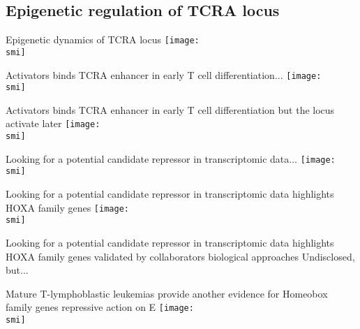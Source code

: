 \documentclass[10pt]{beamer}
\def\smi{out/ln/updir/mw-gcthesis-oral/library.bib}
\begin{document}
\subsection{Epigenetic regulation of TCRA locus}
\begin{frame}{Epigenetic dynamics of TCRA locus}
  \def\smi{out/ln/updir/mw-gcthesis-oral/ink/chromatin-states/genome-view/tcra.pdf}
  \texttt{[image: \\smi]}
\end{frame}
\begin{frame}{Activators binds TCRA enhancer in early T cell differentiation...}
  \def\smi{out/ln/updir/mw-gcthesis-oral/ink/ea-tf-mouse.pdf}
  \texttt{[image: \\smi]}%
\end{frame}
\begin{frame}{Activators binds TCRA enhancer in early T cell differentiation but the locus activate later}
  \def\smi{out/ln/updir/mw-gcthesis-oral/ink/ea-tf-mouse.pdf}
  \texttt{[image: \\smi]}%
\end{frame}
\begin{frame}{Looking for a potential candidate repressor in transcriptomic data...}
  \def\smi{out/ln/updir/mw-gcthesis-oral/ink/rna-clusters/all.pdf}
  \texttt{[image: \\smi]}
\end{frame}
\begin{frame}{Looking for a potential candidate repressor in transcriptomic data highlights HOXA family genes}
  \def\smi{out/ln/updir/mw-gcthesis-oral/ink/rna-clusters/c13-tf.pdf}
  \texttt{[image: \\smi]}
\end{frame}
\begin{frame}{Looking for a potential candidate repressor in transcriptomic data highlights HOXA family genes validated by collaborators biological approaches}
  Undisclosed, but...
\end{frame}
\begin{frame}{Mature T-lymphoblastic leukemias provide another evidence for Homeobox family genes repressive action on E\textalpha{}}
  \def\smi{out/ln/updir/mw-gcthesis-oral/ink/tall/H3K27ac_HOXA5-9_TLX1_TLX3_ealpha_barplot.png}
  \texttt{[image: \\smi]}%
\end{frame}
\end{document}
